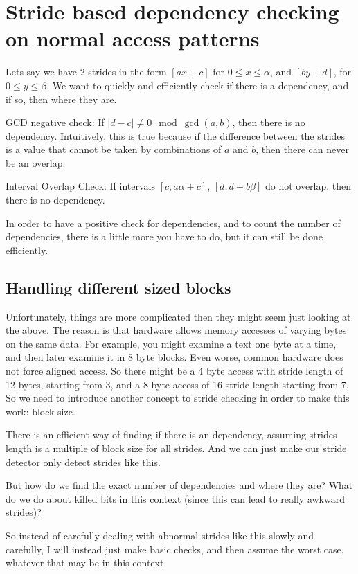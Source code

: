 \documentclass[12pt,twoside]{reedthesis}
\begin{document}
	\section{Stride based dependency checking on normal access patterns}

		Lets say we have 2 strides in the form $[ax+c]$ for $0\le x \le \alpha$, and $[by+d]$, for $0 \le y \le \beta$. We want to quickly and efficiently check if there is a dependency, and if so, then where they are.

		GCD negative check: If $|d-c| \ne 0 \mod \gcd(a,b)$, then there is no dependency. Intuitively, this is true because if the difference between the strides is a value that cannot be taken by combinations of $a$ and $b$, then there can never be an overlap.

		Interval Overlap Check: If intervals $[c,a\alpha+c]$, $[d,d+b\beta]$ do not overlap, then there is no dependency.

		In order to have a positive check for dependencies, and to count the number of dependencies, there is a little more you have to do, but it can still be done efficiently.

		\subsection{Handling different sized blocks}

		Unfortunately, things are more complicated then they might seem just looking at the above.
		The reason is that hardware allows memory accesses of varying bytes on the same data. For example, you might examine a text one byte at a time, and then later examine it in 8 byte blocks. Even worse, common hardware does not force aligned access. So there might be a 4 byte access with stride length of 12 bytes, starting from 3, and a 8 byte access of 16 stride length starting from 7. So we need to introduce another concept to stride checking in order to make this work: block size.

		There is an efficient way of finding if there is an dependency, assuming strides length is a multiple of block size for all strides. And we can just make our stride detector only detect strides like this.

		But how do we find the exact number of dependencies and where they are? What do we do about killed bits in this context (since this can lead to really awkward strides)?

		So instead of carefully dealing with abnormal strides like this slowly and carefully, I will instead just make basic checks, and then assume the worst case, whatever that may be in this context.
\end{document}
